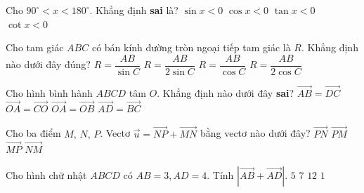 \begin{ex}%
	
	Cho ${90}^\circ <x<{180}^\circ $. Khẳng định \textbf{sai} là?
	\choice
	{\True $\sin{x}<0$}
	{ $\cos{x}<0$}
	{ $\tan{x}<0$}
	{ $\cot{x}<0$}
\end{ex}

\begin{ex}%
	
	Cho tam giác $ABC$ có bán kính đường tròn ngoại tiếp tam giác là $R$. Khẳng định nào dưới đây đúng?
	\choice
	{ $R=\dfrac{AB}{\sin C}$}
	{\True $R=\dfrac{AB}{2\sin C}$}
	{ $R=\dfrac{AB}{\cos C}$}
	{ $R=\dfrac{AB}{2\cos C}$}
\end{ex}

\begin{ex}%
	
	Cho hình bình hành $ABCD$ tâm $O$. Khẳng định nào dưới đây \textbf{sai}?
	\choice
	{ $\overrightarrow{AB}=\overrightarrow{DC}$}
	{ $\overrightarrow{OA}=\overrightarrow{CO}$}
	{\True $\overrightarrow{OA}=\overrightarrow{OB}$}
	{ $\overrightarrow{AD}=\overrightarrow{BC}$}
\end{ex}

\begin{ex}%
	
	Cho ba điểm $M,\,N,\,P$. Vectơ $\overrightarrow{u}=\overrightarrow{NP}+\overrightarrow{MN}$ bằng vectơ nào dưới đây?
	\choice
	{ $\overrightarrow{PN}$}
	{ $\overrightarrow{PM}$}
	{\True $\overrightarrow{MP}$}
	{ $\overrightarrow{NM}$}
\end{ex}

\begin{ex}%
	
	Cho hình chữ nhật $ABCD$ có $AB=3,AD=4$. Tính $\left| \overrightarrow{AB}+\overrightarrow{AD} \right|$.
	\choice
	{\True $5$}
	{ $7$}
	{ $12$}
	{ $1$}
\end{ex}


